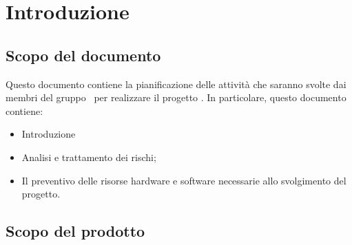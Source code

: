 \section{Introduzione}
\subsection{Scopo del documento}
Questo documento contiene la pianificazione delle attività che saranno svolte dai membri del gruppo \gruppo\ per realizzare il progetto \progetto. In particolare, questo documento contiene:

	\begin{itemize}
		\item Introduzione
		\item Analisi e trattamento dei rischi;
		\item Il preventivo delle risorse hardware e software necessarie allo svolgimento del progetto.
	\end{itemize}
	
\subsection{Scopo del prodotto}
\scopoProdotto
%



